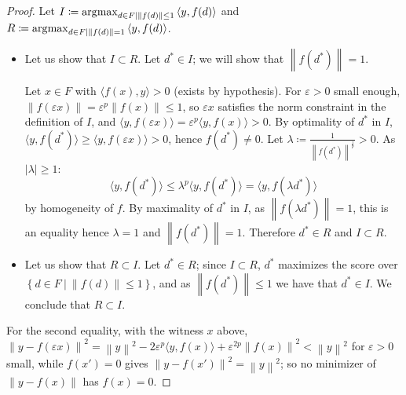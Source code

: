 \begin{proof}

Let
\(I \coloneqq \operatorname*{\arg\!\max}_{d \in F|\left\| {f(d)} \right\| \leq 1}{\langle y,f(d)\rangle}\)
and
\(R \coloneqq \operatorname*{\arg\!\max}_{d \in F|\left\| {f(d)} \right\| = 1}{\langle y,f(d)\rangle}\).

\begin{itemize}
\item
  Let us show that \(I \subset R\). Let \(d^{\ast} \in I\); we will show that
  \(\left\| {f\left( d^{\ast} \right)} \right\| = 1\).

  Let \(x \in F\) with \({\langle f(x),y\rangle} > 0\) (exists by
  hypothesis). For \(\varepsilon > 0\) small enough,
  \(\left\| {f(\varepsilon x)} \right\| = \varepsilon^{p}\left\| {f(x)} \right\| \leq 1\),
  so \(\varepsilon x\) satisfies the norm constraint in the definition of \(I\), and
  \({\langle y,f(\varepsilon x)\rangle} = \varepsilon^{p}{\langle y,f(x)\rangle} > 0\).
  By optimality of \(d^{\ast}\) in \(I\),
  \({\langle y,f\left( d^{\ast} \right)\rangle} \geq {\langle y,f(\varepsilon x)\rangle} > 0\),
  hence \(f\left( d^{\ast} \right) \neq 0\). Let
  \(\lambda \coloneqq \frac{1}{\left\| {f\left( d^{\ast} \right)} \right\|^{\frac{1}{p}}} > 0\).
  As \(|\lambda| \geq 1\):
  \[{\langle y,f\left( d^{\ast} \right)\rangle} \leq \lambda^{p}{\langle y,f\left( d^{\ast} \right)\rangle} = {\langle y,f\left( \lambda d^{\ast} \right)\rangle}\]
  by homogeneity of \(f\). By maximality of \(d^{\ast}\) in \(I\), as
  \(\left\| {f\left( \lambda d^{\ast} \right)} \right\| = 1\), this is
  an equality hence \(\lambda = 1\) and
  \(\left\| {f\left( d^{\ast} \right)} \right\| = 1\). Therefore
  \(d^{\ast} \in R\) and \(I \subset R\).
\item
  Let us show that \(R \subset I\). Let \(d^{\ast} \in R\); since
  \(I \subset R\), \(d^{\ast}\) maximizes the score over
  \(\left\{ d \in F~|~\left\| {f(d)} \right\| \leq 1 \right\}\), and as
  \(\left\| {f\left( d^{\ast} \right)} \right\| \leq 1\) we have that
  \(d^{\ast} \in I\). We conclude that \(R \subset I\).
\end{itemize}

For the second equality, with the witness \(x\) above,
\(\left\| {y - f(\varepsilon x)} \right\|^{2} = \left\| y \right\|^{2} - 2\varepsilon^{p}{\langle y,f(x)\rangle} + \varepsilon^{2p}\left\| {f(x)} \right\|^{2} < \left\| y \right\|^{2}\)
for \(\varepsilon > 0\) small, while \(f(x') = 0\) gives
\(\left\| {y - f(x')} \right\|^{2} = \left\| y \right\|^{2}\); so no
minimizer of \(\left\| {y - f(x)} \right\|\) has \(f(x) = 0\).

\end{proof}


